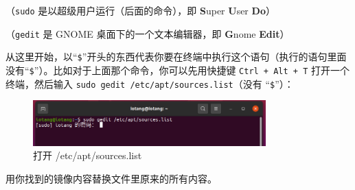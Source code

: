 \documentclass[UTF-8]{ctexart}
\begin{document}
				（\texttt{sudo} 是以超级用户运行（后面的命令），即 \textbf{S}uper \textbf{U}ser \textbf{Do}）
			
				（\texttt{gedit} 是 GNOME 桌面下的一个文本编辑器，即 \textbf{G}nome \textbf{Edit}）
				
				从这里开始，以“\texttt{\$}”开头的东西代表你要在终端中执行这个语句（执行的语句里面没有“\texttt{\$}”）。比如对于上面那个命令，你可以先用快捷键 \texttt{Ctrl + Alt + T} 打开一个终端，然后输入 \texttt{sudo gedit /etc/apt/sources.list}（没有 “\texttt{\$}”）：
	
				\begin{figure}[H]
					\centering
					\includegraphics[width=0.8\textwidth]{fig/gedit_etcaptsourceslist.png}
					\caption*{打开 /etc/apt/sources.list}
				\end{figure}
				
				用你找到的镜像内容替换文件里原来的所有内容。
				
\end{document}
